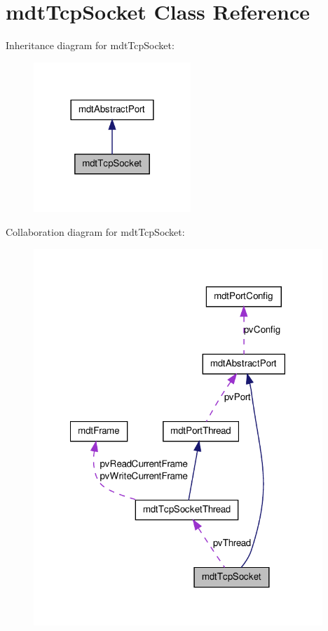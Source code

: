 \hypertarget{classmdt_tcp_socket}{
\section{mdtTcpSocket Class Reference}
\label{classmdt_tcp_socket}
}


Inheritance diagram for mdtTcpSocket:
\nopagebreak
\begin{figure}[H]
\begin{center}
\leavevmode
\includegraphics[width=168pt]{classmdt_tcp_socket__inherit__graph}
\end{center}
\end{figure}


Collaboration diagram for mdtTcpSocket:
\nopagebreak
\begin{figure}[H]
\begin{center}
\leavevmode
\includegraphics[width=309pt]{classmdt_tcp_socket__coll__graph}
\end{center}
\end{figure}
